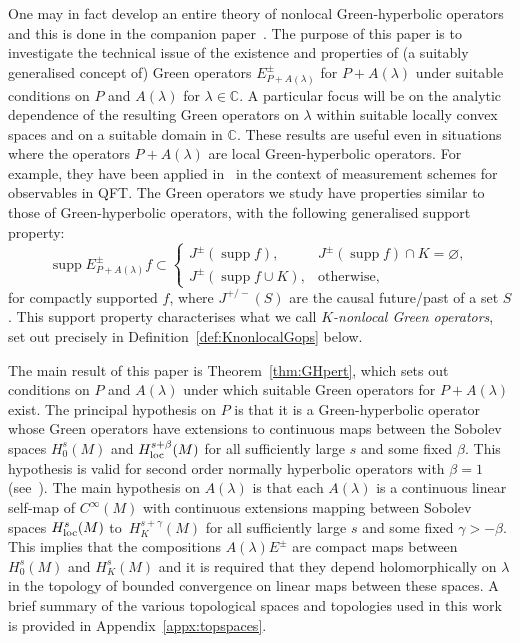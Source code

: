\documentclass[pdftex]{sigma}
\numberwithin{equation}{section}
\newcommand{\CC}{{\mathbb C}}
\DeclareMathOperator{\supp}{supp}
\newcommand{\loc}{{\rm loc}}
\begin{document}
 One may in fact develop an entire theory of nonlocal Green-hyperbolic operators and this is done in the companion paper~\cite{FewVer:20xx}. The purpose of this paper is to investigate the technical issue of the existence and properties of (a suitably generalised concept of) Green operators $E^\pm_{P+A(\lambda)}$ for $P+ A(\lambda)$ under suitable conditions on $P$ and $A(\lambda)$ for $\lambda\in\CC$. A particular focus will be on the analytic dependence of the resulting Green operators on $\lambda$ within suitable locally convex spaces and on a suitable domain in $\CC$. These results are useful even in situations where the operators $P+A(\lambda)$ are local Green-hyperbolic operators. For example, they have been applied in~\cite{FewsterJubbRuep:2022} in the context of measurement schemes for observables in QFT. The Green operators we study have properties similar to those of Green-hyperbolic operators, with the following generalised support property:
 \begin{equation*} \supp E_{P+A(\lambda)}^{\pm} f \subset
 	\begin{cases} J^{\pm}(\supp f), & J^\pm(\supp f)\cap K=\varnothing,\\
 		J^{\pm}(\supp f\cup K), & \text{otherwise},
 	\end{cases}
 \end{equation*}
 for compactly supported $f$, where $J^{+/-}(S)$ are the causal future/past of a set $S$. This support property characterises
 what we call \emph{$K$-nonlocal Green operators}, set out precisely in Definition~\ref{def:KnonlocalGops} below.

 The main result of this paper is Theorem~\ref{thm:GHpert}, which sets out conditions
 on $P$ and $A(\lambda)$ under which suitable Green operators for $P+A(\lambda)$ exist.
 The principal hypothesis on $P$ is that it is a Green-hyperbolic operator whose Green operators
 have extensions to continuous maps between the Sobolev spaces $H_0^s(M)$ and $H^{s+\beta}_\loc(M)$ for all sufficiently large $s$ and some fixed $\beta$. This hypothesis is valid for second order normally hyperbolic operators with $\beta=1$ (see~\cite[Theorem 6.5.3]{DuiHoer_FIOii:1972}). The main hypothesis on $A(\lambda)$ is that each $A(\lambda)$ is a continuous linear self-map of $C^\infty(M)$ with continuous extensions mapping between Sobolev spaces $H^{s}_\loc(M)$ to~$H^{s+\gamma}_K(M)$ for all sufficiently large $s$ and some fixed $\gamma>-\beta$. This implies that the compositions $A(\lambda)E^\pm$
 are compact maps between $H^s_0(M)$ and $H^s_K(M)$ and it is required that they depend holomorphically on $\lambda$ in the topology of bounded convergence on linear maps between these spaces. A brief summary of the various topological spaces and topologies used in this work is provided in Appendix~\ref{appx:topspaces}.
\end{document}
